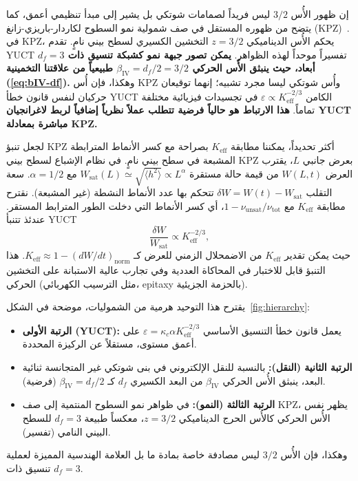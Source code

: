 \documentclass[11pt,a4paper]{article}
\newcommand{\Keff}{K_{\mathrm{eff}}}
\begin{document}
	إن ظهور الأُس \(3/2\) ليس فريداً لصمامات شوتكي بل يشير إلى مبدأ تنظيمي أعمق، كما يتضح من ظهوره المستقل في صف شمولية نمو السطوح لكاردار-باريزي-زانغ (KPZ)~\cite{KPZ}. في KPZ، يحكم الأُس الديناميكي \(z = 3/2\) التخشين الكسيري لسطح بيني نامٍ. تقدم YUCT تفسيراً موحداً لهذه الظواهر. \textbf{يمكن تصور جبهة نمو كشبكة تنسيق ذات \(d_f = 3\) أبعاد، حيث ينبثق الأُس الحركي \(\beta_{\mathrm{IV}} = d_f/2 = 3/2\) طبيعياً من علاقتنا التخمينية (\ref{eq:bIV-df}).} وهكذا، فإن أُس KPZ وأُس شوتكي ليسا مجرد تشبيه؛ إنهما توقيعان حركيان لنفس قانون خطأ YUCT الكامن \(\varepsilon \propto \Keff^{-2/3}\) في تجسيدات فيزيائية مختلفة تماماً. \textbf{هذا الارتباط هو حالياً فرضية تتطلب عملاً نظرياً إضافياً لربط لاغرانجيان YUCT مباشرة بمعادلة KPZ.}
	
	لجعل تنبؤ KPZ أكثر تحديداً، يمكننا مطابقة \(\Keff\) بصراحة مع كسر الأنماط المترابطة المشبعة في سطح بيني نامٍ. في نظام الإشباع لسطح بيني KPZ بعرض جانبي \(L\)، يقترب العرض \(W(L,t)\) من قيمة حالة مستقرة \(W_{\text{sat}}(L) \simeq \sqrt{\langle h^2 \rangle} \propto L^{\alpha}\) مع \(\alpha = 1/2\). سعة التقلب \(\delta W = W(t) - W_{\text{sat}}\) تتحكم بها عدد الأنماط النشطة (غير المشبعة). نقترح مطابقة \(\Keff\) مع \(1 - \nu_{\text{unsat}}/\nu_{\text{tot}}\)، أي كسر الأنماط التي دخلت الطور المترابط المستقر. عندئذ تتنبأ YUCT
	\begin{equation}
		\frac{\delta W}{W_{\text{sat}}} \propto \Keff^{-2/3},
		\label{eq:kpz-prediction}
	\end{equation}
	حيث يمكن تقدير \(\Keff\) من الاضمحلال الزمني للعرض كـ \(\Keff \approx 1 - (dW/dt)_{\text{norm}}\). هذا التنبؤ قابل للاختبار في المحاكاة العددية وفي تجارب عالية الاستبانة على التخشين الحركي (مثل الترسيب الكهربائي، epitaxy بالحزمة الجزيئية).
	
	يقترح هذا التوحيد هرمية من الشموليات، موضحة في الشكل~\ref{fig:hierarchy}:
	\begin{itemize}
		\item \textbf{الرتبة الأولى (YUCT):} يعمل قانون خطأ التنسيق الأساسي \(\varepsilon = \kappa_c \alpha K_{\mathrm{eff}}^{-2/3}\) على أعمق مستوى، مستقلاً عن الركيزة المحددة.
		\item \textbf{الرتبة الثانية (النقل):} بالنسبة للنقل الإلكتروني في بنى شوتكي غير المتجانسة ثنائية البعد، ينبثق الأُس الحركي \(\beta_{\mathrm{IV}}\) من البعد الكسيري \(d_f\) كـ \(\beta_{\mathrm{IV}} = d_f/2\) (فرضية).
		\item \textbf{الرتبة الثالثة (النمو):} في ظواهر نمو السطوح المنتمية إلى صف KPZ، يظهر نفس الأُس الحركي كالأُس الحرج الديناميكي \(z = 3/2\)، معكساً طبيعة \(d_f = 3\) للسطح البيني النامي (تفسير).
	\end{itemize}
	وهكذا، فإن الأُس \(3/2\) ليس مصادفة خاصة بمادة ما بل العلامة الهندسية المميزة لعملية تنسيق ذات \(d_f = 3\).
	
\end{document}
